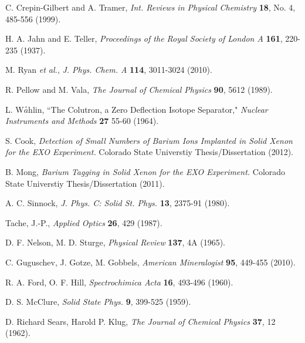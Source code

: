 \documentclass[PhD, copyrightpage]{csuthesis} %
\begin{document}
\begin{thebibliography}{00}
  C. Crepin-Gilbert and A. Tramer, \emph{Int. Reviews in Physical Chemistry} \textbf{18}, No. 4, 485-556 (1999).
 
  H. A. Jahn and E. Teller, \emph{Proceedings of the Royal Society of London A} \textbf{161}, 220-235 (1937).
 
 
  M. Ryan \emph{et al.}, \emph{J. Phys. Chem. A} \textbf{114}, 3011-3024 (2010).
 
  R. Pellow and M. Vala, \emph{The Journal of Chemical Physics} \textbf{90}, 5612 (1989).
 
  L. W$\overset{\circ}{a}$hlin, ``The Colutron, a Zero Deflection Isotope Separator," \emph{Nuclear Instruments and Methods} \textbf{27} 55-60 (1964).
 
 
  S. Cook, \emph{Detection of Small Numbers of Barium Ions Implanted in Solid Xenon for the EXO Experiment.}  Colorado State Universtiy Thesis/Dissertation (2012).
 
  B. Mong, \emph{Barium Tagging in Solid Xenon for the EXO Experiment.}  Colorado State Universtiy Thesis/Dissertation (2011).
 
  A. C. Sinnock, \emph{J. Phys. C: Solid St. Phys.} \textbf{13}, 2375-91 (1980).
 
   Tache, J.-P., \emph{Applied Optics} \textbf{26}, 429 (1987).

  D. F. Nelson, M. D. Sturge, \emph{Physical Review} \textbf{137}, 4A (1965).
 
  C. Guguschev, J. Gotze, M. Gobbels, \emph{American Mineralogist} \textbf{95}, 449-455 (2010).
 
  R. A. Ford, O. F. Hill, \emph{Spectrochimica Acta} \textbf{16}, 493-496 (1960).
 
  D. S. McClure, \emph{Solid State Phys.} \textbf{9}, 399-525 (1959).
 
  D. Richard Sears, Harold P. Klug, \emph{The Journal of Chemical Physics} \textbf{37}, 12 (1962).
 
 \end{thebibliography}
% 
\end{document}
